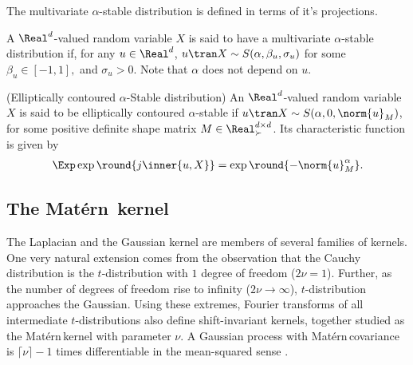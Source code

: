 \documentclass{article}
\def\matern{Mat\'ern\,}
\def\cite{\citep}
\theoremstyle{plain}
\begin{document}
 The multivariate $\alpha$-stable distribution is defined in terms of it's projections. 
\begin{definition} A $\Real^d$-valued random variable $X$ is said to have a multivariate $\alpha$-stable distribution if, for any $u \in \Real^d$, $u\tran X\sim S(\alpha,\beta_u,\sigma_u)$ for some $\beta_u\in[-1,1],$ and $\sigma_u>0$. Note that $\alpha$ does not depend on $u.$
\end{definition}
\begin{definition}(Elliptically contoured $\alpha$-Stable distribution) \cite[Sec.3]{nolan2005multivariate}\label{def:eca-stable}
    An $\Real^d$-valued random variable $X$ is said to be elliptically contoured $\alpha$-stable if $u\tran X\sim S(\alpha,0,\norm{u}_M)$, for some positive definite shape matrix $M\in\Real^{d\times d}_{\succ}$. Its characteristic function is given by
    \begin{align*}
        \Exp \exp\round{j\inner{u,X}} = \exp\round{-\norm{u}_M^\alpha}.
    \end{align*}
\end{definition}


\subsection{The \texorpdfstring{\matern}{matern} kernel}

The Laplacian and the Gaussian kernel are members of several families of kernels. One very natural extension comes from the observation that the Cauchy distribution is the $t$-distribution with $1$ degree of freedom ($2\nu = 1$). Further, as the number of degrees of freedom rise to infinity ($2\nu \rightarrow \infty$), $t$-distribution approaches the Gaussian. Using these extremes, Fourier transforms of all intermediate $t$-distributions also define shift-invariant kernels, together studied as the \matern kernel with parameter $\nu$. A Gaussian process with \matern covariance is $\lceil \nu \rceil-1$ times differentiable in the mean-squared sense \cite[Sec. 4.2.1]{williams2006gaussian}.
\end{document}

